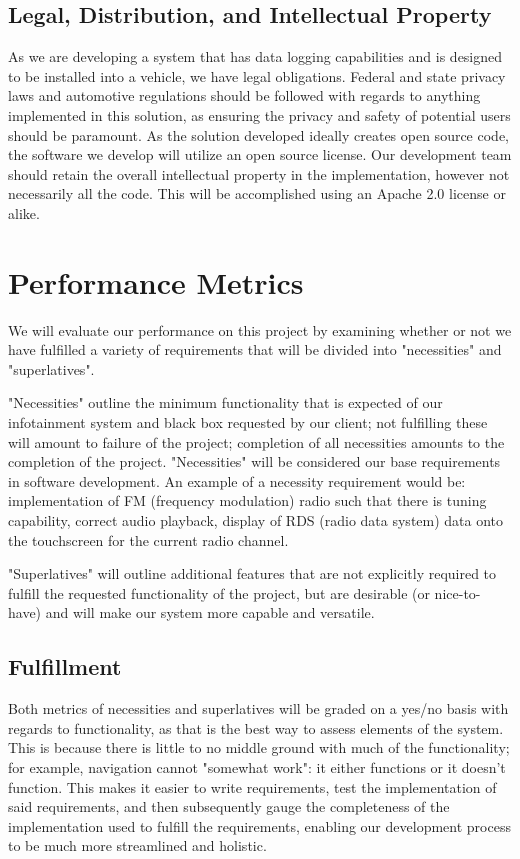 \documentclass[onecolumn, draftclsnofoot,10pt, compsoc]{IEEEtran}
\begin{document}
\subsection{Legal, Distribution, and Intellectual Property}
As we are developing a system that has data logging capabilities and is designed to be installed into a vehicle, we have legal obligations. Federal and state privacy laws and automotive regulations should be followed with regards to anything implemented in this solution, as ensuring the privacy and safety of potential users should be paramount. As the solution developed ideally creates open source code, the software we develop will utilize an open source license. Our development team should retain the overall intellectual property in the implementation, however not necessarily all the code. This will be accomplished using an Apache 2.0 license or alike.\par

\section{Performance Metrics}
We will evaluate our performance on this project by examining whether or not we have fulfilled a variety of requirements that will be divided into "necessities" and "superlatives".\par
"Necessities" outline the minimum functionality that is expected of our infotainment system and black box requested by our client; not fulfilling these will amount to failure of the project; completion of all necessities amounts to the completion of the project. "Necessities" will be considered our base requirements in software development. An example of a necessity requirement would be: implementation of FM (frequency modulation) radio such that there is tuning capability, correct audio playback, display of RDS (radio data system) data onto the touchscreen for the current radio channel.\par
"Superlatives" will outline additional features that are not explicitly required to fulfill the requested functionality of the project, but are desirable (or nice-to-have) and will make our system more capable and versatile.\par

\subsection{Fulfillment}
Both metrics of necessities and superlatives will be graded on a yes/no basis with regards to functionality, as that is the best way to assess elements of the system. This is because there is little to no middle ground with much of the functionality; for example, navigation cannot "somewhat work": it either functions or it doesn't function. This makes it easier to write requirements, test the implementation of said requirements, and then subsequently gauge the completeness of the  implementation used to fulfill the requirements, enabling our development process to be much more streamlined and holistic.\par
\end{document}
